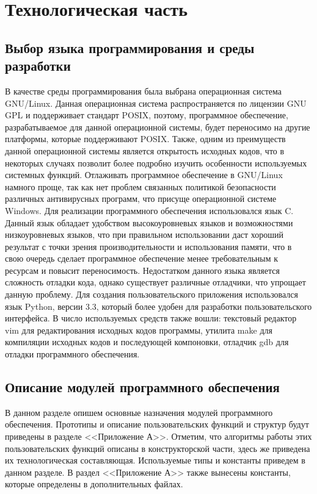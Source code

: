 \section{Технологическая часть}

\subsection{Выбор языка программирования и среды разработки}
В качестве среды программирования была выбрана операционная система
GNU/Linux. Данная операционная система распространяется по лицензии
GNU GPL и поддерживает стандарт POSIX, поэтому, программное
обеспечение, разрабатываемое для данной операционной системы, будет
переносимо на другие платформы, которые поддерживают POSIX. Также,
одним из преимуществ данной операционной системы является открытость
исходных кодов, что в некоторых случаях позволит более подробно изучить
особенности используемых системных функций. Отлаживать программное
обеспечение в GNU/Linux намного проще, так как нет проблем связанных
политикой безопасности различных антивирусных программ, что присуще
операционной системе Windows.
\newpar
Для реализации программного обеспечения использовался язык C. Данный
язык обладает удобством высокоуровневых языков и возможностями
низкоуровневых языков, что при правильном использовании даст хороший
результат с точки зрения производительности и использования памяти, что в
свою очередь сделает программное обеспечение менее требовательным к
ресурсам и повысит переносимость. Недостатком данного языка является
сложность отладки кода, однако существует различные отладчики, что
упрощает данную проблему.
\newpar
Для создания пользовательского приложения использовался язык Python, версии 3.3,
который более удобен для разработки пользовательского
интерфейса.
\newpar
В число используемых средств также вошли: текстовый редактор vim для
редактирования исходных кодов программы, утилита make для компиляции
исходных кодов и последующей компоновки, отладчик gdb для отладки
программного обеспечения.
\subsection{Описание модулей программного обеспечения}
В данном разделе опишем основные назначения модулей программного
обеспечения. Прототипы и описание пользовательских функций и структур
будут приведены в разделе <<Приложение А>>. Отметим, что алгоритмы работы
этих пользовательских функций описаны в конструкторской части, здесь
же приведена их технологическая составляющая. Используемые типы и
константы приведем в данном разделе. В раздел <<Приложение А>> также
вынесены константы, которые определены в дополнительных файлах.

